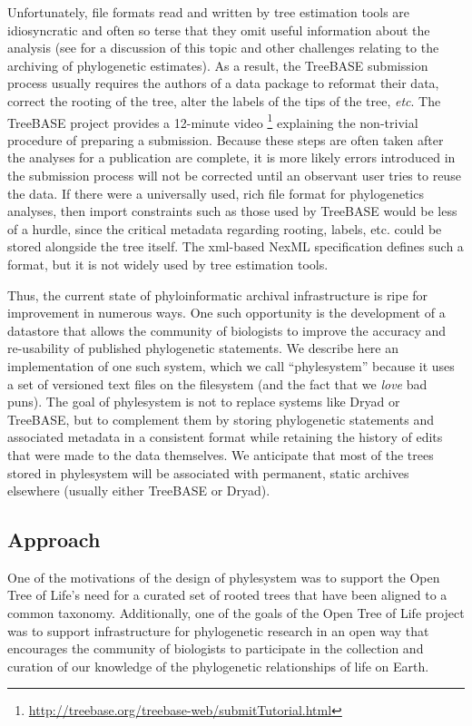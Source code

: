 \documentclass{bioinfo}
\newcommand{\ps}{phylesystem\xspace}
\newcommand{\otol}{Open Tree of Life\xspace}
\begin{document}
Unfortunately, file formats read and written by tree estimation tools are idiosyncratic and often so 
    terse that they omit useful information about the analysis (see \citet{StoltzfusEtAl2012} for a discussion
    of this topic and other challenges relating to the archiving of phylogenetic estimates).
As a result, the TreeBASE submission process usually requires the authors of a data package to reformat their data, correct
    the rooting of the tree, alter the labels of the tips of the tree, {\em etc}.
The TreeBASE project provides a 12-minute video 
    \footnote{\url{http://treebase.org/treebase-web/submitTutorial.html}} 
    explaining the non-trivial procedure of preparing a submission.
Because these steps are often taken after the analyses for a publication are complete, it is more likely 
    errors introduced in the submission process will not be corrected until an observant user tries to reuse the data.
If there were a universally used, rich file format for phylogenetics analyses, then import constraints such as those
    used by TreeBASE would be less of a hurdle, since the critical metadata regarding rooting, labels, etc. could be
    stored alongside the tree itself.
The xml-based NexML specification \citep{NeXML} defines such a format, but it is not widely used by tree estimation tools.

Thus, the current state of phyloinformatic archival infrastructure is ripe for improvement in numerous ways.
One such opportunity is the development of a datastore that allows the community of biologists to improve the
    accuracy and re-usability of published phylogenetic statements.
We describe here an implementation of one such system, which we call ``phylesystem'' because it uses a set of
    versioned text files on the filesystem (and the fact that we {\em love} bad puns).
The goal of \ps is not to replace systems like Dryad or TreeBASE, but to complement them by 
    storing phylogenetic statements and associated metadata in a consistent format while retaining the history of
    edits that were made to the data themselves.
We anticipate that most of the trees stored in \ps will be associated with permanent, static archives
    elsewhere (usually either TreeBASE or Dryad).

\subsection{Approach}
One of the motivations of the design of \ps was to support the \otol's need for a curated set
    of rooted trees that have been aligned to a common taxonomy.
Additionally, one of the goals of the \otol project was to support infrastructure for phylogenetic
    research in an open way that encourages the community of biologists to participate in the 
    collection and curation of our knowledge of the phylogenetic relationships of life on Earth.
\end{document}
